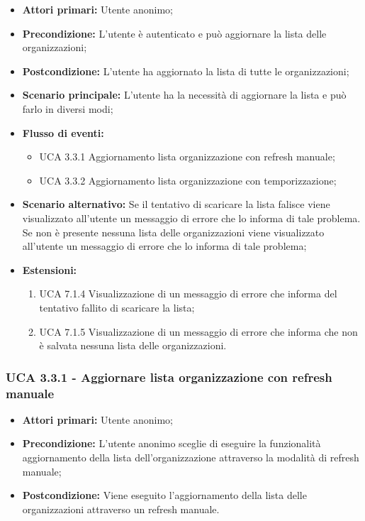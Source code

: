 \begin{itemize} 
	\item \textbf{Attori primari:} Utente anonimo;
	\item \textbf{Precondizione:} L'utente è autenticato e può aggiornare la lista delle organizzazioni;
	\item \textbf{Postcondizione:} L'utente ha aggiornato la lista di tutte le organizzazioni;
	\item \textbf{Scenario principale:}  L'utente ha la necessità di aggiornare la lista e può farlo in diversi modi;
	\item \textbf{Flusso di eventi:}
	\begin{itemize}
		\item UCA 3.3.1 Aggiornamento lista organizzazione con refresh manuale;
		\item UCA 3.3.2 Aggiornamento lista organizzazione con temporizzazione;
	\end{itemize}
	\item \textbf{Scenario alternativo:} Se il tentativo di scaricare la lista falisce viene visualizzato all'utente un messaggio di errore che lo informa di tale problema. Se non è presente nessuna lista delle organizzazioni viene visualizzato all'utente un messaggio di errore che lo informa di tale problema;
	\item \textbf{Estensioni:}
	\begin{enumerate}
		\item UCA 7.1.4 Visualizzazione di un messaggio di errore che informa del tentativo fallito di scaricare la lista;
		\item UCA 7.1.5 Visualizzazione di un messaggio di errore che informa che non è salvata nessuna lista delle organizzazioni.
	\end{enumerate}
\end{itemize}

\subsubsection{UCA 3.3.1 - Aggiornare lista organizzazione con refresh manuale}%
\begin{itemize}
	\item \textbf{Attori primari:} Utente anonimo;
	\item \textbf{Precondizione:} L'utente anonimo sceglie di eseguire la funzionalità aggiornamento della lista dell'organizzazione attraverso la modalità di refresh manuale;
	\item \textbf{Postcondizione:} Viene eseguito l'aggiornamento della lista delle organizzazioni attraverso un refresh manuale.
	
\end{itemize}

